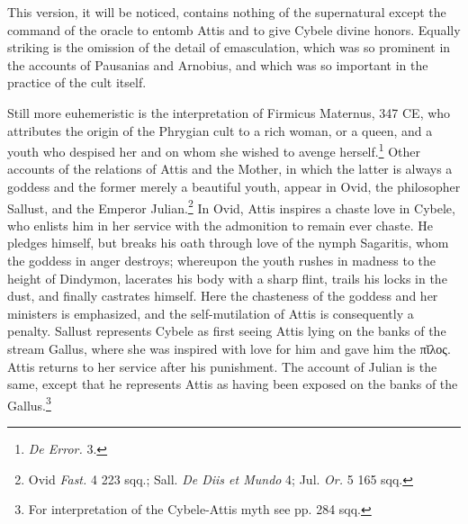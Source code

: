 \documentclass[a4paper, 11pt, oneside, polutonikogreek, french]{article}
\begin{document}
This version, it will be noticed, contains nothing of the supernatural except the command of the oracle to entomb Attis and to give Cybele divine honors. Equally striking is the omission of the detail of emasculation, which was so prominent in the accounts of Pausanias and Arnobius, and which was so important in the practice of the cult itself.

Still more euhemeristic is the interpretation of Firmicus Maternus, 347 \textsc{CE}, who attributes the origin of the Phrygian cult to a rich woman, or a queen, and a youth who despised her and on whom she wished to avenge herself.\footnote{\emph{De Error.} 3.} Other accounts of the relations of Attis and the Mother, in which the latter is always a goddess and the former merely a beautiful youth, appear in Ovid, the philosopher Sallust, and the Emperor Julian.\footnote{Ovid \emph{Fast.} 4 223 sqq.; Sall. \emph{De Diis et Mundo} 4; Jul. \emph{Or.} 5 165 sqq.} In Ovid, Attis inspires a chaste love in Cybele, who enlists him in her service with the admonition to remain ever chaste. He pledges himself, but breaks his oath through love of the nymph Sagaritis, whom the goddess in anger destroys; whereupon the youth rushes in madness to the height of Dindymon, lacerates his body with a sharp flint, trails his locks in the dust, and finally castrates himself. Here the chasteness of the goddess and her ministers is emphasized, and the self-mutilation of Attis is consequently a penalty. Sallust represents Cybele as first seeing Attis lying on the banks of the stream Gallus, where she was inspired with love for him and gave him the πῐλος. Attis returns to her service after his punishment. The account of Julian is the same, except that he represents Attis as having been exposed on the banks of the Gallus.\footnote{For interpretation of the Cybele-Attis myth see pp. 284 sqq.}
\end{document}
